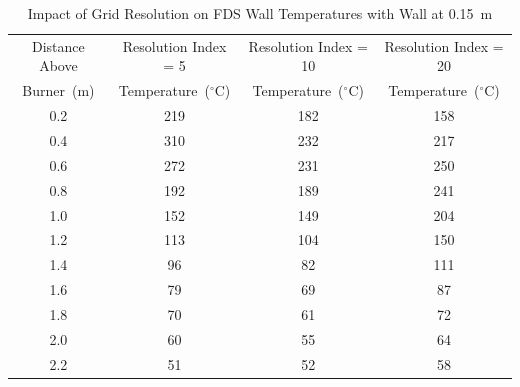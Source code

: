 \documentclass[twoside]{uocthesis}
\begin{document}
\begin{table}
	\small
	\centering
	\begin{tabular}{|c|c|c|c|}
		\hline Distance Above  & Resolution Index = 5      & Resolution Index = 10     & Resolution Index = 20 \\
		Burner~(m)	   & Temperature~($^{\circ}$C) & Temperature~($^{\circ}$C) & Temperature~($^{\circ}$C)	\\ \hline
		\hline 0.2 			   & 219					   & 182					& 158 			 	\\
		\hline 0.4			   & 310					   & 232					& 217			 	\\
		\hline 0.6			   & 272					   & 231					& 250			 	\\
		\hline 0.8			   & 192					   & 189					& 241				\\
		\hline 1.0			   & 152					   & 149 					& 204				\\
		\hline 1.2			   & 113					   & 104 					& 150				\\
		\hline 1.4			   & 96						   & 82 					& 111				\\
		\hline 1.6			   & 79						   & 69 					& 87				\\
		\hline 1.8			   & 70						   & 61 					& 72				\\
		\hline 2.0			   & 60						   & 55 					& 64				\\
		\hline 2.2			   & 51						   & 52 					& 58				\\
		\hline
	\end{tabular}
	\caption[Impact of Grid Resolution on FDS Wall Temperatures with Wall at 0.15~m]{Impact of Grid Resolution on FDS Wall Temperatures with Wall at 0.15~m}
	\label{tab:FDSRI_wallp5D}
\end{table}
\end{document}
